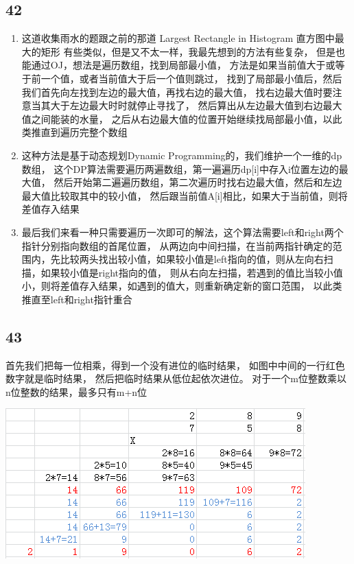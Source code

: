 \documentclass[12pt,a4paper]{article}
\begin{document}
\subsection{42}
\begin{enumerate}
\item
\begin{CJK}{UTF8}{gbsn}
这道收集雨水的题跟之前的那道 Largest Rectangle in Histogram 直方图中最大的矩形 
有些类似，但是又不太一样，我最先想到的方法有些复杂，
但是也能通过OJ，想法是遍历数组，找到局部最小值，
方法是如果当前值大于或等于前一个值，或者当前值大于后一个值则跳过，
找到了局部最小值后，然后我们首先向左找到左边的最大值，再找右边的最大值，
找右边最大值时要注意当其大于左边最大时时就停止寻找了，
然后算出从左边最大值到右边最大值之间能装的水量，
之后从右边最大值的位置开始继续找局部最小值，以此类推直到遍历完整个数组
\end{CJK}
\item
\begin{CJK}{UTF8}{gbsn}
这种方法是基于动态规划Dynamic Programming的，我们维护一个一维的dp数组，
这个DP算法需要遍历两遍数组，第一遍遍历dp[i]中存入i位置左边的最大值，
然后开始第二遍遍历数组，第二次遍历时找右边最大值，然后和左边最大值比较取其中的较小值，
然后跟当前值A[i]相比，如果大于当前值，则将差值存入结果
\end{CJK}
\item
\begin{CJK}{UTF8}{gbsn}
最后我们来看一种只需要遍历一次即可的解法，这个算法需要left和right两个指针分别指向数组的首尾位置，
从两边向中间扫描，在当前两指针确定的范围内，先比较两头找出较小值，如果较小值是left指向的值，则从左向右扫描，如果较小值是right指向的值，
则从右向左扫描，若遇到的值比当较小值小，则将差值存入结果，如遇到的值大，则重新确定新的窗口范围，
以此类推直至left和right指针重合
\end{CJK}
\end{enumerate}

\subsection{43}
\begin{CJK}{UTF8}{gbsn}
首先我们把每一位相乘，得到一个没有进位的临时结果，
如图中中间的一行红色数字就是临时结果，
然后把临时结果从低位起依次进位。
对于一个m位整数乘以n位整数的结果，最多只有m+n位
\end{CJK}
\begin{center}
\includegraphics[width=0.8\linewidth]{0043.png}
\end{center}
\end{document}
